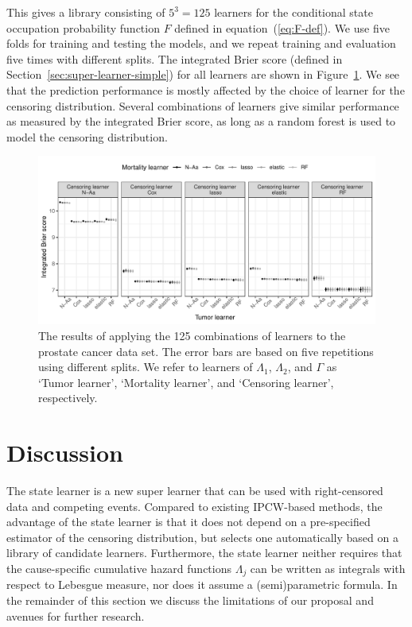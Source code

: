 \documentclass[a4paper,danish]{article}
\theoremstyle{plain} %
\numberwithin{theorem}{section}
\theoremstyle{definition} %
\theoremstyle{remark}
\newcommand{\1}{\mathds{1}}
\begin{document}
This gives a library consisting of \( 5^3 = 125 \) learners for the
conditional state occupation probability function \( F \) defined in
equation~(\ref{eq:F-def}). We use five folds for training and testing
the models, and we repeat training and evaluation five times with
different splits.  The integrated Brier score (defined in
Section~\ref{sec:super-learner-simple}) for all learners are shown in
Figure~\ref{fig:zelefski-real}. We see that the prediction
performance is mostly affected by the choice of learner for the
censoring distribution. Several combinations of learners give similar
performance as measured by the integrated Brier score, as long as a
random forest is used to model the censoring distribution.

\begin{figure}
  \centering %
  \includegraphics[width=1\linewidth]{real-data-state-learner.pdf}
  \caption[]{The results of applying the 125 combinations of learners to the
    prostate cancer data set. The error bars are based on five repetitions using
    different splits. We refer to learners of \( \Lambda_1 \), \( \Lambda_2 \),
    and $\Gamma$ as `Tumor learner', `Mortality learner', and `Censoring
    learner', respectively.}
  \label{fig:zelefski-real}
\end{figure}


\section{Discussion}
\label{sec:discussion}

The state learner is a new super learner that can be used with
right-censored data and competing events. Compared to existing
IPCW-based methods, the advantage of the state learner is that
it does not depend on a pre-specified estimator of the
censoring distribution, but selects one automatically based on
a library of candidate learners. Furthermore, the state
learner neither requires that the cause-specific cumulative
hazard functions \( \Lambda_j \) can be written as integrals
with respect to Lebesgue measure, nor does it assume a
(semi)parametric formula. In the remainder of this section
we discuss the limitations of our proposal and avenues for
further research.
\end{document}
